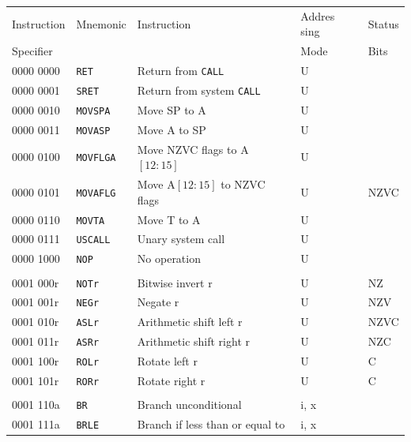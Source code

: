 \documentclass[10pt,fleqn]{book}
\begin{document}
\begin{tabular}{ l l l l l }
\toprule
Instruction & Mnemonic       & Instruction                         & Addres sing                  & Status\\
Specifier   &                &                                      & Mode                        & Bits\\
\midrule

0000 0000   & \verb|RET|     & Return from \verb|CALL|              & U \\
0000 0001   & \verb|SRET|    & Return from system \verb|CALL|       & U \\
0000 0010   & \verb|MOVSPA|  & Move SP to A                         & U \\
0000 0011   & \verb|MOVASP|  & Move A to SP                         & U \\  
0000 0100   & \verb|MOVFLGA| & Move NZVC flags to A$[12:15]$        & U \\
0000 0101   & \verb|MOVAFLG| & Move A$[12:15]$ to NZVC flags        & U                           & NZVC\\
0000 0110   & \verb|MOVTA|   & Move T to A                          & U \\
0000 0111   & \verb|USCALL|  & Unary system call                    & U \\
0000 1000   & \verb|NOP|     & No operation                         & U \\
 \\
0001 000r   & \verb|NOTr|    & Bitwise invert r                     & U                           & NZ \\
0001 001r   & \verb|NEGr|    & Negate r                             & U                           & NZV \\
0001 010r   & \verb|ASLr|    & Arithmetic shift left r              & U                           & NZVC \\
0001 011r   & \verb|ASRr|    & Arithmetic shift right r             & U                           & NZC \\
0001 100r   & \verb|ROLr|    & Rotate left r                        & U                           & C \\
0001 101r   & \verb|RORr|    & Rotate right r                       & U                           & C \\
 \\
0001 110a   & \verb|BR|      & Branch unconditional                 & i, x \\
0001 111a   & \verb|BRLE|    & Branch if less than or equal to      & i, x \\ 

\end{tabular}
\end{document}
